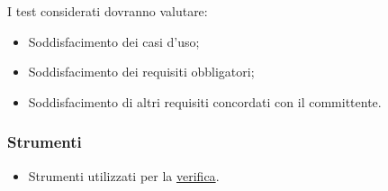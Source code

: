 I test considerati dovranno valutare:
\begin{itemize}
    \item 
        Soddisfacimento dei casi d’uso;
    \item 
        Soddisfacimento dei requisiti obbligatori;
    \item 
        Soddisfacimento di altri requisiti concordati con il committente.
\end{itemize}

\subsubsection{Strumenti}
\begin{itemize}
    \item 
        Strumenti utilizzati per la \hyperlink{subsubsec:strumentiVerifica}{verifica}.
\end{itemize}

